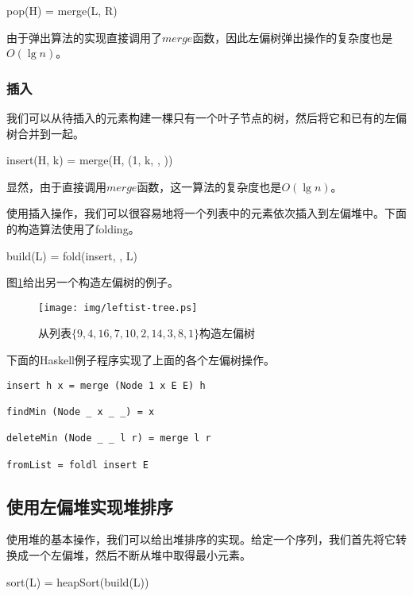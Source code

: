 \documentclass[UTF8]{article}
\begin{document}
\be
pop(H) = merge(L, R)
\ee

由于弹出算法的实现直接调用了$merge$函数，因此左偏树弹出操作的复杂度也是$O(\lg n)$。

\subsubsection{插入}

我们可以从待插入的元素构建一棵只有一个叶子节点的树，然后将它和已有的左偏树合并到一起。

\be
insert(H, k) = merge(H, (1, k, \phi, \phi))
\ee

显然，由于直接调用$merge$函数，这一算法的复杂度也是$O(\lg n)$。

使用插入操作，我们可以很容易地将一个列表中的元素依次插入到左偏堆中。下面的构造算法使用了folding。

\be
build(L) = fold(insert, \phi, L)
\ee

图\ref{fig:leftist-tree}给出另一个构造左偏树的例子。

\begin{figure}[htbp]
   \begin{center}
   	  \texttt{[image: img/leftist-tree.ps]}
    \caption{从列表$\{9, 4, 16, 7, 10, 2, 14, 3, 8, 1\}$构造左偏树}
    \label{fig:leftist-tree}
   \end{center}
\end{figure}

下面的Haskell例子程序实现了上面的各个左偏树操作。

\lstset{language=Haskell}
\begin{lstlisting}
insert h x = merge (Node 1 x E E) h

findMin (Node _ x _ _) = x

deleteMin (Node _ _ l r) = merge l r

fromList = foldl insert E
\end{lstlisting}

\subsection{使用左偏堆实现堆排序}

使用堆的基本操作，我们可以给出堆排序的实现。给定一个序列，我们首先将它转换成一个左偏堆，然后不断从堆中取得最小元素。

\be
sort(L) = heapSort(build(L))
\ee
\end{document}
